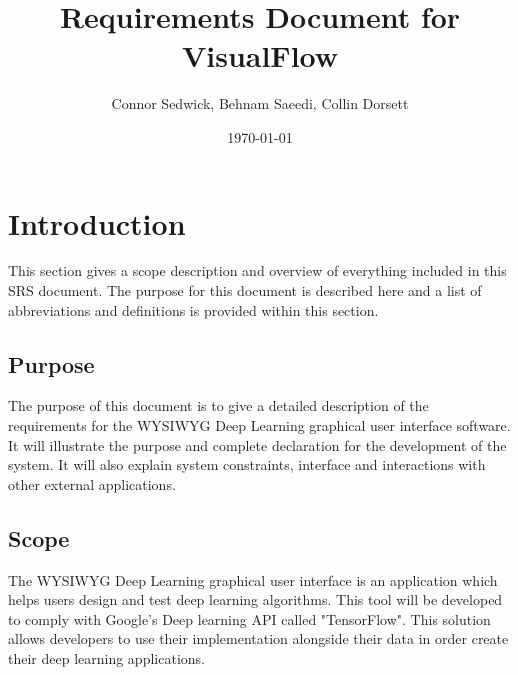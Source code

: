 \documentclass[journal,10pt,onecolumn,compsoc]{IEEEtran} \usepackage[margin=1.0in]{geometry} \usepackage{pdfpages} \usepackage{graphicx}
\title{Requirements Document for VisualFlow}
\author{Connor Sedwick, Behnam Saeedi,  Collin Dorsett}
\date{\today}
\begin{document}
\maketitle
\newpage
\tableofcontents
\newpage
\section{Introduction}

This section gives a scope description and overview of everything included in this SRS document. 
The purpose for this document is described here and a list of abbreviations and definitions is provided within this section.

\subsection{Purpose}

The purpose of this document is to give a detailed description of the requirements for the WYSIWYG Deep Learning graphical user interface software. It will illustrate the purpose and complete declaration for the development of the system. 
It will also explain system constraints, interface and interactions with other external applications. 

\subsection{Scope}

The WYSIWYG Deep Learning graphical user interface is an application which helps users design and test deep learning algorithms.
This tool will be developed to comply with Google's Deep learning API called "TensorFlow\texttrademark".
This solution allows developers to use their implementation alongside their data in order create their deep learning applications.
\end{document}
